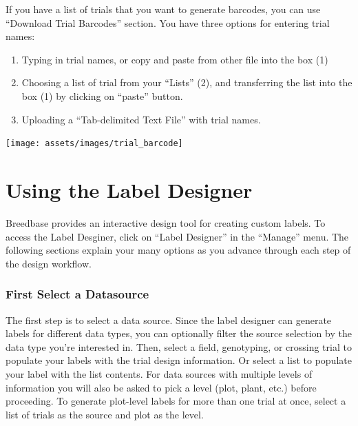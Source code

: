 \documentclass[
  12pt,
]{book}
\begin{document}
If you have a list of trials that you want to generate barcodes, you can use ``Download Trial Barcodes'' section. You have three options for entering trial names:

\begin{enumerate}
\def\labelenumi{\arabic{enumi}.}
\item
  Typing in trial names, or copy and paste from other file into the box (1)
\item
  Choosing a list of trial from your ``Lists'' (2), and transferring the list into the box (1) by clicking on ``paste'' button.
\item
  Uploading a ``Tab-delimited Text File'' with trial names.
\end{enumerate}

\begin{center}\texttt{[image: assets/images/trial\_barcode]} \end{center}

\hypertarget{using-the-label-designer}{%
\chapter{Using the Label Designer}\label{using-the-label-designer}}

Breedbase provides an interactive design tool for creating custom labels. To access the Label Desginer, click on ``Label Designer'' in the ``Manage'' menu. The following sections explain your many options as you advance through each step of the design workflow.

\hypertarget{first-select-a-datasource}{%
\subsection{First Select a Datasource}\label{first-select-a-datasource}}

The first step is to select a data source. Since the label designer can generate labels for different data types, you can optionally filter the source selection by the data type you're interested in. Then, select a field, genotyping, or crossing trial to populate your labels with the trial design information. Or select a list to populate your label with the list contents. For data sources with multiple levels of information you will also be asked to pick a level (plot, plant, etc.) before proceeding. To generate plot-level labels for more than one trial at once, select a list of trials as the source and plot as the level.
\end{document}
